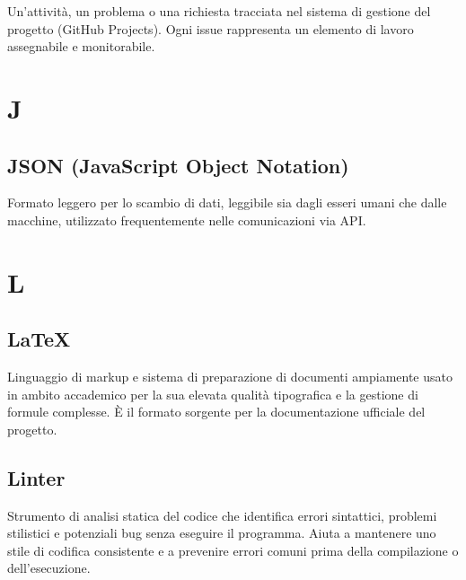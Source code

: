 \documentclass[a4paper, 11pt, oneside]{scrartcl} %
\begin{document}
Un'attività, un problema o una richiesta tracciata nel sistema di gestione del progetto (GitHub Projects). Ogni issue rappresenta un elemento di lavoro assegnabile e monitorabile.

\vspace{0.5cm}

\section*{J}

\subsection*{JSON (JavaScript Object Notation)}
Formato leggero per lo scambio di dati, leggibile sia dagli esseri umani che dalle macchine, utilizzato frequentemente nelle comunicazioni via API.
\vspace{0.5cm}


\section*{L}


\subsection*{LaTeX}


Linguaggio di markup e sistema di preparazione di documenti ampiamente usato in ambito accademico per la sua elevata qualità tipografica e la gestione di formule complesse. È il formato sorgente per la documentazione ufficiale del progetto.

\vspace{0.5cm}

\subsection*{Linter}
Strumento di analisi statica del codice che identifica errori sintattici, problemi stilistici e potenziali bug senza eseguire il programma. Aiuta a mantenere uno stile di codifica consistente e a prevenire errori comuni prima della compilazione o dell'esecuzione.
\vspace{0.5cm}
\end{document}
